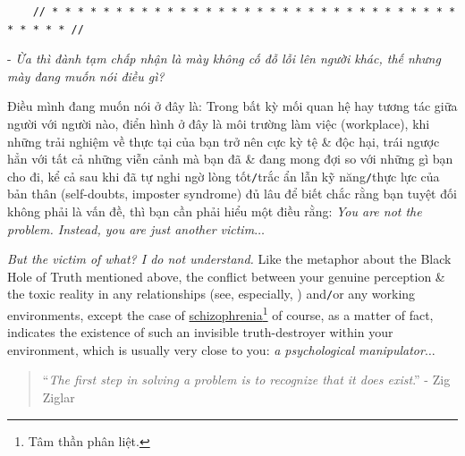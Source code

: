 \documentclass[12pt]{article}
\begin{document}
\begin{verbatim}
	// * * * * * * * * * * * * * * * * * * * * * * * * * * * * * * * * * * * * * //
\end{verbatim}

\noindent
{} - {\it Ừa thì đành tạm chấp nhận là mày không cố đỗ lỗi lên người khác, thế nhưng mày đang muốn nói điều gì?}

Điều mình đang muốn nói ở đây là: Trong bất kỳ mối quan hệ hay tương tác giữa người với người nào, điển hình ở đây là môi trường làm việc (workplace), khi những trải nghiệm về thực tại của bạn trở nên cực kỳ tệ \& độc hại, trái ngược hẳn với tất cả những viễn cảnh mà bạn đã \& đang mong đợi so với những gì bạn cho đi, kể cả sau khi đã tự nghi ngờ lòng tốt{\tt/}trắc ẩn lẫn kỹ năng{\tt/}thực lực của bản thân (self-doubts, imposter syndrome) đủ lâu để biết chắc rằng bạn tuyệt đối không phải là vấn đề, thì bạn cần phải hiểu một điều rằng: {\it You are not the problem. Instead, you are just another victim}$\ldots$

{\it But the victim of what? I do not understand.} Like the metaphor about the Black Hole of Truth mentioned above, the conflict between your genuine perception \& the toxic reality in any relationships (see, especially, \cite{Bancroft2003}) and{\tt/}or any working environments, except the case of \href{https://en.wikipedia.org/wiki/Schizophrenia}{schizophrenia}\footnote{Tâm thần phân liệt.} of course, as a matter of fact, indicates the existence of such an invisible truth-destroyer within your environment, which is usually very close to you: {\it a psychological manipulator}$\ldots$

\begin{quotation}
	``{\it The first step in solving a problem is to recognize that it does exist}.'' - Zig Ziglar
\end{quotation}
\end{document}
